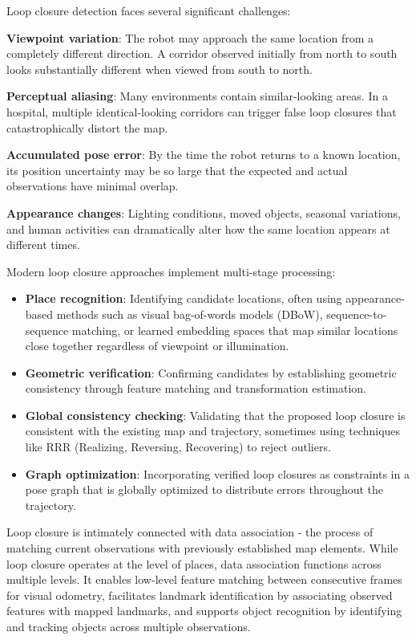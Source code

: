 \documentclass[12pt]{article}
\begin{document}
    \newpage

    Loop closure detection faces several significant challenges:

    \textbf{Viewpoint variation}: The robot may approach the same location from a completely different direction. A corridor observed initially from north to south looks substantially different when viewed from south to north.
    
    \textbf{Perceptual aliasing}: Many environments contain similar-looking areas. In a hospital, multiple identical-looking corridors can trigger false loop closures that catastrophically distort the map.
    
    \textbf{Accumulated pose error}: By the time the robot returns to a known location, its position uncertainty may be so large that the expected and actual observations have minimal overlap.
    
    \textbf{Appearance changes}: Lighting conditions, moved objects, seasonal variations, and human activities can dramatically alter how the same location appears at different times.


    \newpage

    Modern loop closure approaches implement multi-stage processing:

    \begin{itemize}
        \item \textbf{Place recognition}: Identifying candidate locations, often using appearance-based methods such as visual bag-of-words models (DBoW), sequence-to-sequence matching, or learned embedding spaces that map 
        similar locations close together regardless of viewpoint or illumination.
        \item \textbf{Geometric verification}: Confirming candidates by establishing geometric consistency through feature matching and transformation estimation.
        \item \textbf{Global consistency checking}: Validating that the proposed loop closure is consistent with the existing map and trajectory, sometimes using techniques like RRR (Realizing, Reversing, Recovering) to reject outliers.
        \item \textbf{Graph optimization}: Incorporating verified loop closures as constraints in a pose graph that is globally optimized to distribute errors throughout the trajectory.
    \end{itemize}

    Loop closure is intimately connected with data association - the process of matching current observations with previously established map elements. While loop closure operates at the 
    level of places, data association functions across multiple levels. It enables low-level feature matching between consecutive frames for visual odometry, facilitates landmark 
    identification by associating observed features with mapped landmarks, and supports object recognition by identifying and tracking objects across multiple observations.
\end{document}
